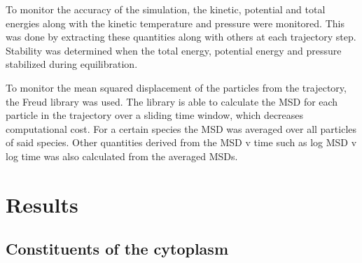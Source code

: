 \documentclass[draft, english]{volcanica-template}
\begin{document}
To monitor the accuracy of the simulation, the kinetic, potential and total energies along with the kinetic temperature and pressure were monitored. This was done by extracting these quantities along with others at each trajectory step. Stability was determined when the total energy, potential energy and pressure stabilized during equilibration.

To monitor the mean squared displacement of the particles from the trajectory, the Freud library was used. The library is able to calculate the MSD for each particle in the trajectory over a sliding time window, which decreases computational cost. For a certain species the MSD was averaged over all particles of said species. Other quantities derived from the MSD v time such as log MSD v log time was also calculated from the averaged MSDs.

\section{Results}

\subsection{Constituents of the cytoplasm}
\end{document}
